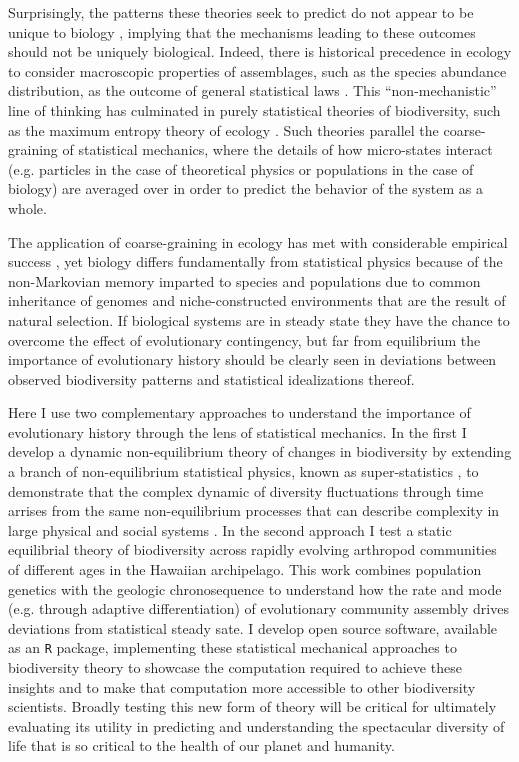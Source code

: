 Surprisingly, the patterns these theories seek to predict do not
appear to be unique to biology \citep{nekola2007}, implying that the
mechanisms leading to these outcomes should not be uniquely
biological.  Indeed, there is historical precedence in ecology to
consider macroscopic properties of assemblages, such as the species
abundance distribution, as the outcome of general statistical laws
\citep{fisher1943, preston1950, preston1962a, preston1962b}. This
``non-mechanistic'' line of thinking has culminated in purely
statistical theories of biodiversity, such as the maximum entropy
theory of ecology \citep{harte2011}. Such theories parallel the
coarse-graining of statistical mechanics, where the details of how
micro-states interact (e.g. particles in the case of theoretical
physics or populations in the case of biology) are averaged over in
order to predict the behavior of the system as a whole.

The application of coarse-graining in ecology has met with
considerable empirical success \citep[e.g.][]{banavar2007, pueyo2007,
  dewar2008, harte2011}, yet biology differs fundamentally from
statistical physics because of the non-Markovian memory imparted to
species and populations due to common inheritance of genomes and
niche-constructed environments \citep{odling2003} that are the result
of natural selection.  If biological systems are in steady state they
have the chance to overcome the effect of evolutionary contingency,
but far from equilibrium the importance of evolutionary history should
be clearly seen in deviations between observed biodiversity patterns
and statistical idealizations thereof.

Here I use two complementary approaches to understand the importance
of evolutionary history through the lens of statistical mechanics.
In the first I develop a dynamic non-equilibrium theory of changes in
biodiversity by extending a branch of non-equilibrium statistical
physics, known as super-statistics \citep{beck2003, beck2004}, to
demonstrate that the complex dynamic of diversity fluctuations
through time arrises from the same non-equilibrium processes that can
describe complexity in large physical \citep{beck2004} and social
systems \citep{fuentes2009}.  In the second approach I test a static
equilibrial theory of biodiversity \citep[the maximum entropy theory
of ecology][]{harte2011} across rapidly evolving arthropod
communities of different ages in the Hawaiian archipelago. This work
combines population genetics with the geologic chronosequence to
understand how the rate and mode (e.g. through adaptive
differentiation) of evolutionary community assembly drives deviations
from statistical steady sate. I develop open source software,
available as an \texttt{R} package, implementing these statistical
mechanical approaches to biodiversity theory to showcase the
computation required to achieve these insights and to make that
computation more accessible to other biodiversity scientists.  Broadly
testing this new form of theory will be critical for ultimately
evaluating its utility in predicting and understanding the spectacular
diversity of life that is so critical to the health of our planet and
humanity.


\printbibliography[heading=subbibliography]

